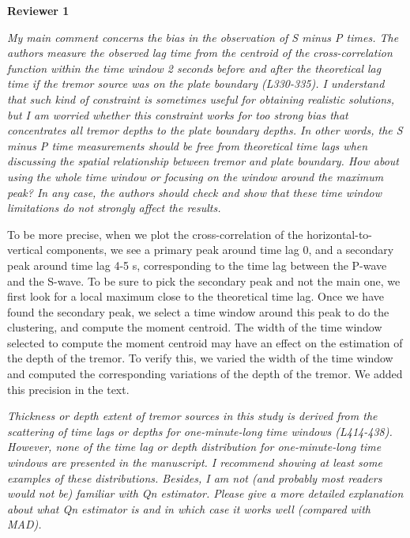 \documentclass[letterpaper, 12pt]{article}
\begin{document}
\textbf{Reviewer 1}

\bigskip

\textit{My main comment concerns the bias in the observation of S minus P times. The authors measure the observed lag time from the centroid of the cross-correlation function within the time window 2 seconds before and after the theoretical lag time if the tremor source was on the plate boundary (L330-335). I understand that such kind of constraint is sometimes useful for obtaining realistic solutions, but I am worried whether this constraint works for too strong bias that concentrates all tremor depths to the plate boundary depths. In other words, the S minus P time measurements should be free from theoretical time lags when discussing the spatial relationship between tremor and plate boundary. How about using the whole time window or focusing on the window around the maximum peak? In any case, the authors should check and show that these time window limitations do not strongly affect the results.}

\bigskip

To be more precise, when we plot the cross-correlation of the horizontal-to-vertical components, we see a primary peak around time lag 0, and a secondary peak around time lag 4-5 s, corresponding to the time lag between the P-wave and the S-wave. To be sure to pick the secondary peak and not the main one, we first look for a local maximum close to the theoretical time lag. Once we have found the secondary peak, we select a time window around this peak to do the clustering, and compute the moment centroid. The width of the time window selected to compute the moment centroid may have an effect on the estimation of the depth of the tremor. To verify this, we varied the width of the time window and computed the corresponding variations of the depth of the tremor. We added this precision in the text.

\bigskip

\textit{Thickness or depth extent of tremor sources in this study is derived from the scattering of time lags or depths for one-minute-long time windows (L414-438). However, none of the time lag or depth distribution for one-minute-long time windows are presented in the manuscript. I recommend showing at least some examples of these distributions. Besides, I am not (and probably most readers would not be) familiar with Qn estimator. Please give a more detailed explanation about what Qn estimator is and in which case it works well (compared with MAD).}
\end{document}
